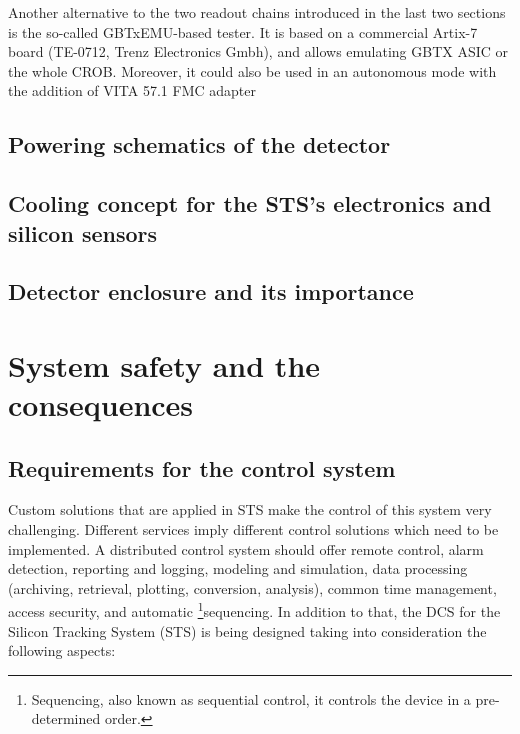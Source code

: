 \label{tester}
Another alternative to the two readout chains introduced in the last two sections is the so-called GBTxEMU-based tester. It is based on a commercial Artix-7 board (TE-0712, Trenz Electronics Gmbh), and allows emulating GBTX ASIC or the whole CROB. Moreover, it could also be used in an autonomous mode with the addition of VITA  57.1 FMC adapter
\subsection{Powering schematics of the detector}
\label{powering}
\subsection{Cooling concept for the STS's electronics and silicon sensors}
\label{cooling}

\subsection{Detector enclosure and its importance}
\section{System safety and the consequences}
\subsection{Requirements for the control system}
\label{sys:req}
Custom solutions that are applied in \gls{STS} make the control of this system very challenging. Different services imply different control solutions which need to be implemented.
A distributed control system should offer remote control, alarm detection, reporting and logging, modeling and simulation, data processing (archiving, retrieval, plotting, conversion, analysis), common time management, access security, and automatic \footnote{Sequencing, also known as sequential control, it controls the device in a pre-determined order.}{sequencing}.
In addition to that, the \gls{DCS} for the Silicon Tracking System (\gls{STS}) is being designed taking into consideration the following aspects:

